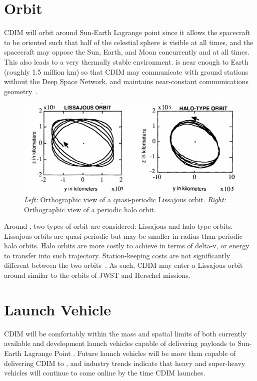 \documentclass{ws-jai}
\begin{document}
\section{Orbit}
\label{sec:orbit}
CDIM will orbit around Sun-Earth Lagrange point \Ltwo{} since it allows the spacecraft to be oriented such that half of the celestial sphere is visible at all times, and the spacecraft may oppose the Sun, Earth, and Moon concurrently and at all times.
This also leads to a very thermally stable environment.
\Ltwo{} is near enough to Earth (roughly 1.5 million \si{\kilo\meter}) so that CDIM may communicate with ground stations without the Deep Space Network, and maintains near-constant communications geometry~\cite{canalias2004}.

\begin{figure}[!ht]
  \centering
  \includegraphics[width=.6\linewidth]{figs/orbits.png}
  \caption{
      \emph{Left:} Orthographic view of a quasi-periodic Lissajous orbit.
      \emph{Right:} Orthographic view of a periodic halo orbit.~\cite{gordon1993orbit}
\label{fig:orbits}
  }
\end{figure}

Around \Ltwo, two types of orbit are considered: Lissajous and halo-type orbits.
Lissajous orbits are quasi-periodic but may be smaller in radius than periodic halo orbits.
Halo orbits are more costly to achieve in terms of delta-v, or energy to transfer into such trajectory.
Station-keeping costs are not significantly different between the two orbits~\cite{gordon1993orbit}.
As such, CDIM may enter a Lissajous orbit around \Ltwo{} similar to the orbits of JWST and Herschel missions.

\section{Launch Vehicle}
\label{sec:launch}
CDIM will be comfortably within the mass and spatial limits of both currently available and development launch vehicles capable of delivering payloads to Sun-Earth Lagrange Point \Ltwo.
Future launch vehicles will be more than capable of delivering CDIM to \Ltwo, and industry trends indicate that heavy and super-heavy vehicles will continue to come online by the time CDIM launches.
\end{document}
